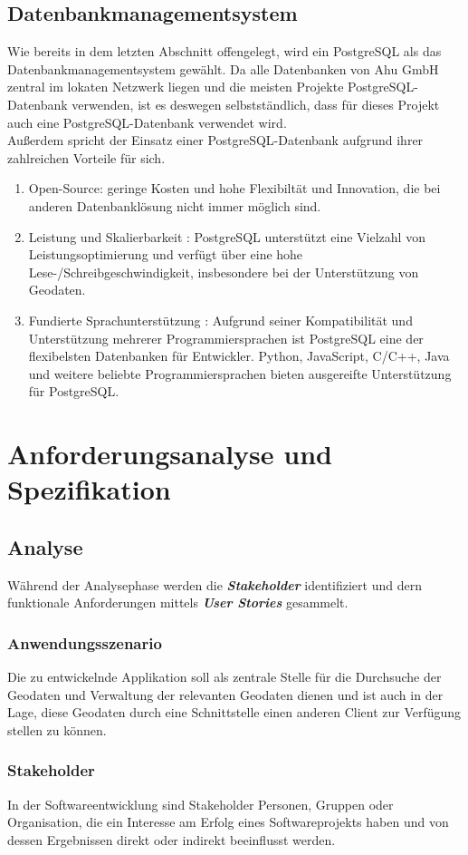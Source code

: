 \documentclass[a4paper,12pt]{scrreprt}
\begin{document}
\section{Datenbankmanagementsystem}
Wie bereits in dem letzten Abschnitt offengelegt, wird ein PostgreSQL als das Datenbankmanagementsystem gewählt. 
Da alle Datenbanken von Ahu GmbH zentral im lokaten Netzwerk liegen und die meisten Projekte PostgreSQL-Datenbank verwenden, ist es deswegen selbstständlich, dass für dieses Projekt auch eine PostgreSQL-Datenbank verwendet wird. \\
Außerdem spricht der Einsatz einer PostgreSQL-Datenbank aufgrund ihrer zahlreichen Vorteile für sich.
\begin{enumerate}
\item Open-Source: geringe Kosten und hohe Flexibiltät und Innovation, die bei anderen Datenbanklösung nicht immer möglich sind. 
\item Leistung und Skalierbarkeit : PostgreSQL unterstützt eine Vielzahl von Leistungsoptimierung und verfügt über eine hohe Lese-/Schreibgeschwindigkeit, insbesondere bei der Unterstützung von Geodaten.
\item Fundierte Sprachunterstützung : Aufgrund seiner Kompatibilität und Unterstützung mehrerer Programmiersprachen ist PostgreSQL eine der flexibelsten Datenbanken für Entwickler. Python, JavaScript, C/C++, Java und weitere beliebte Programmiersprachen bieten ausgereifte Unterstützung für PostgreSQL.
\end{enumerate}

\chapter{Anforderungsanalyse und Spezifikation }
\section{Analyse}
Während der Analysephase werden die \textbf{\textit{Stakeholder}} identifiziert und dern funktionale Anforderungen mittels \textbf{\textit{User Stories}} gesammelt.
\subsection{Anwendungsszenario}
Die zu entwickelnde Applikation soll als zentrale Stelle für die Durchsuche der Geodaten und Verwaltung der relevanten Geodaten dienen und ist auch in der Lage, diese Geodaten durch eine Schnittstelle einen anderen Client zur Verfügung stellen zu können.
\subsection{Stakeholder}
In der Softwareentwicklung sind Stakeholder Personen, Gruppen oder Organisation, die ein Interesse am Erfolg eines Softwareprojekts haben und von dessen Ergebnissen direkt oder indirekt beeinflusst werden.
\end{document}
